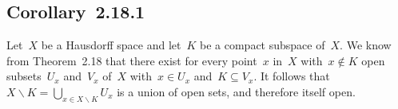 \subsection{Corollary~2.18.1}

Let~$X$ be a Hausdorff space and let~$K$ be a compact subspace of~$X$.
We know from Theorem~2.18 that there exist for every point~$x$ in~$X$ with~$x ∉ K$ open subsets~$U_x$ and~$V_x$ of~$X$ with~$x ∈ U_x$ and~$K ⊆ V_x$.
It follows that~$X ∖ K = ⋃_{x ∈ X ∖ K} U_x$ is a union of open sets, and therefore itself open.
